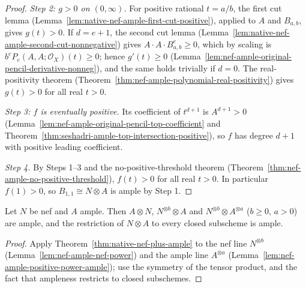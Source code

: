 \begin{proof}
\emph{Step 2: $g>0$ on $(0,\infty)$.} For positive rational $t=a/b$, the first cut lemma
(Lemma~\ref{lem:native-nef-ample-first-cut-positive}), applied to $A$ and $B_{a,b}$, gives
$g(t)>0$. If $d=e+1$, the second cut lemma
(Lemma~\ref{lem:native-nef-ample-second-cut-nonnegative}) gives
$A\cdot A\cdot B_{a,b}^{e}\ge0$, which by scaling is $b^eP_e(A,A;\mathcal O_X)(t)\ge0$; hence
$g'(t)\ge0$ (Lemma~\ref{lem:nef-ample-original-pencil-derivative-nonneg}), and the same holds
trivially if $d=0$. The real-positivity theorem
(Theorem~\ref{thm:nef-ample-polynomial-real-positivity}) gives $g(t)>0$ for all real $t>0$.

\emph{Step 3: $f$ is eventually positive.} Its coefficient of $t^{d+1}$ is
$A^{d+1}>0$ (Lemma~\ref{lem:nef-ample-original-pencil-top-coefficient} and
Theorem~\ref{thm:seshadri-ample-top-intersection-positive}), so $f$ has degree $d+1$ with
positive leading coefficient.

\emph{Step 4.} By Steps 1--3 and the no-positive-threshold theorem
(Theorem~\ref{thm:nef-ample-no-positive-threshold}), $f(t)>0$ for all real $t>0$. In
particular $f(1)>0$, so $B_{1,1}\cong N\otimes A$ is ample by Step 1.
\end{proof}

\begin{corollary}[Variants]
\label{cor:native-nef-plus-ample-variants}
\leanok
{}
Let $N$ be nef and $A$ ample. Then $A\otimes N$, $N^{\otimes b}\otimes A$ and
$N^{\otimes b}\otimes A^{\otimes a}$ ($b\ge0$, $a>0$) are ample, and the restriction of
$N\otimes A$ to every closed subscheme is ample.
\end{corollary}
\begin{proof}
Apply Theorem~\ref{thm:native-nef-plus-ample} to the nef line $N^{\otimes b}$
(Lemma~\ref{lem:nef-ample-nef-power}) and the ample line $A^{\otimes a}$
(Lemma~\ref{lem:nef-ample-positive-power-ample}); use the symmetry of the tensor product, and
the fact that ampleness restricts to closed subschemes.
\end{proof}
